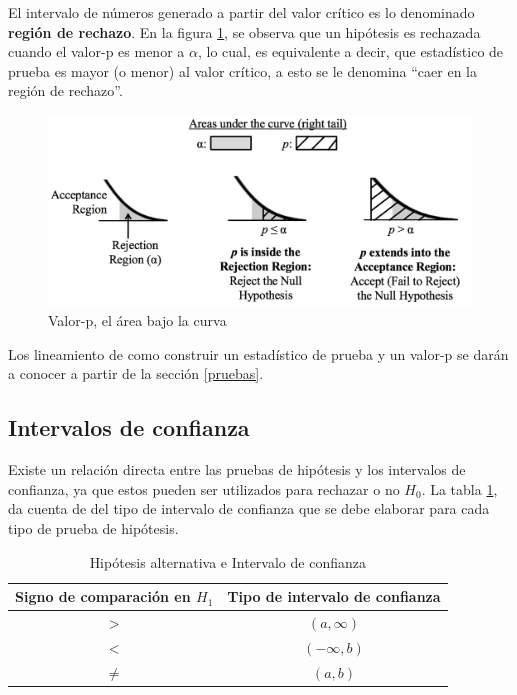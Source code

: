 \documentclass[
]{book}
\theoremstyle{definition}
\theoremstyle{definition}
\theoremstyle{definition}
\theoremstyle{definition}
\theoremstyle{remark}
\begin{document}
El intervalo de números generado a partir del valor crítico es lo denominado \textbf{región de rechazo}. En la figura \ref{fig:regiones2}, se observa que un hipótesis es rechazada cuando el valor-p es menor a \(\alpha\), lo cual, es equivalente a decir, que estadístico de prueba es mayor (o menor) al valor crítico, a esto se le denomina ``caer en la región de rechazo''.

\begin{figure}

{\centering \includegraphics[width=0.8\linewidth]{img/RR} 

}

\caption{Valor-p, el área bajo la curva}\label{fig:regiones2}
\end{figure}

Los lineamiento de como construir un estadístico de prueba y un valor-p se darán a conocer a partir de la sección \ref{pruebas}.

\hypertarget{intervalos-de-confianza}{%
\subsection{Intervalos de confianza}\label{intervalos-de-confianza}}

Existe un relación directa entre las pruebas de hipótesis y los intervalos de confianza, ya que estos pueden ser utilizados para rechazar o no \(H_0\). La tabla \ref{tab:ICpruebas}, da cuenta de del tipo de intervalo de confianza que se debe elaborar para cada tipo de prueba de hipótesis.

\begin{table}[H]

\caption{\label{tab:ICpruebas}Hipótesis alternativa e Intervalo de confianza}
\centering
\begin{tabular}[t]{cc}
\toprule
Signo de comparación en $H_1$ & Tipo de intervalo de confianza\\
\midrule
$>$ & $(a,\infty )$\\
$<$ & $(-\infty ,b)$\\
$\neq$ & $(a,b)$\\
\bottomrule
\end{tabular}
\end{table}
\end{document}
